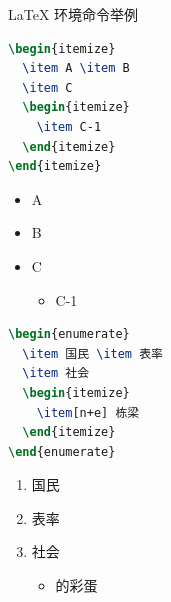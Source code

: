 \documentclass{beamer}
\begin{document}
\begin{frame}[fragile]{\LaTeX{} 环境命令举例}
    \begin{minipage}{0.5\linewidth}
\begin{lstlisting}[language=TeX]
\begin{itemize}
  \item A \item B
  \item C
  \begin{itemize}
    \item C-1
  \end{itemize}
\end{itemize}
\end{lstlisting}
    \end{minipage}\hspace{1cm}
    \begin{minipage}{0.3\linewidth}
        \begin{itemize}
            \item A
            \item B
            \item C
            \begin{itemize}
                \item C-1
            \end{itemize}
        \end{itemize}
    \end{minipage}
    \medskip
    \pause
    \begin{minipage}{0.5\linewidth}
\begin{lstlisting}[language=TeX]
\begin{enumerate}
  \item 国民 \item 表率
  \item 社会
  \begin{itemize}
    \item[n+e] 栋梁
  \end{itemize}
\end{enumerate}
\end{lstlisting}
    \end{minipage}\hspace{1cm}
    \begin{minipage}{0.3\linewidth}
        \begin{enumerate}
            \item 国民
            \item 表率
            \item 社会
            \begin{itemize}
                \item[\href{https://caihanlin.com/hobbies}{Lance}] 的彩蛋
            \end{itemize}
        \end{enumerate}
    \end{minipage}
\end{frame}
\end{document}
